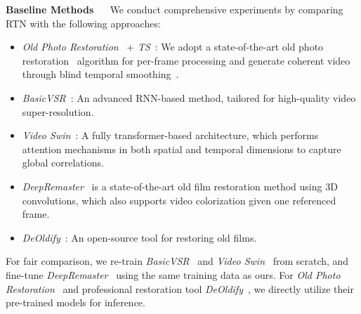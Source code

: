 \documentclass[10pt,twocolumn,letterpaper]{article}
\begin{document}
	\noindent\textbf{Baseline Methods} ~~ We conduct comprehensive experiments by comparing RTN with the following approaches:
	\begin{itemize}[leftmargin=*]
		\itemsep0em 
		\item \textit{Old Photo Restoration}~\cite{wan2020bringing} + \textit{TS}~\cite{lai2018learning}: We adopt a state-of-the-art old photo restoration~\cite{wan2020bringing} algorithm for per-frame processing and generate coherent video through blind temporal smoothing~\cite{lai2018learning}.
		\item \textit{BasicVSR}~\cite{chan2021basicvsr}: An advanced RNN-based method, tailored for high-quality video super-resolution.
		\item \textit{Video Swin}~\cite{liu2021video}: A fully transformer-based architecture, which performs attention mechanisms in both spatial and temporal dimensions to capture global correlations. 
		\item \textit{DeepRemaster}~\cite{iizuka2019deepremaster} is a state-of-the-art old film restoration method using 3D convolutions, which also supports video colorization given one referenced frame. 
		\item \textit{DeOldify}~\cite{DeOldify}: An open-source tool for restoring old films.
	\end{itemize}
	
	For fair comparison, we re-train \textit{BasicVSR}~\cite{chan2021basicvsr} and \textit{Video Swin}~\cite{liu2021video} from scratch, and fine-tune \textit{DeepRemaster}~\cite{iizuka2019deepremaster} using the same training data as ours. For \textit{Old Photo Restoration}~\cite{wan2020bringing} and professional restoration tool \textit{DeOldify}~\cite{DeOldify}, we directly utilize their pre-trained models for inference.
	
	
	
\end{document}

